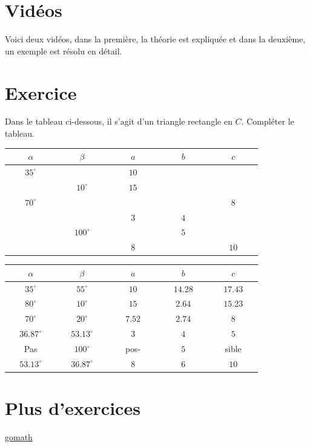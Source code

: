 \documentclass[a4paper,11pt]{article}
\begin{document}
\section{Vidéos}
Voici deux vidéos, dans la première, la théorie est expliquée et dans la deuxième, un exemple est résolu en détail.\\
 


\section{Exercice}
Dans le tableau ci-dessous, il s'agit d'un triangle rectangle en $C$. Compléter le tableau.
\begin{center}
\begin{tabular}{ | c | c | c | c | c | }
  \hline
 $\phantom{texte}\alpha\phantom{texte}$ & $\phantom{texte}\beta\phantom{texte}$ \phantom{texte}& $\phantom{texte}a\phantom{texte}$ & $\phantom{texte}b\phantom{texte}$ & $\phantom{texte}c\phantom{texte}$   \\
   \hline
 $35^{\circ}$ &  & $10$ &  &    \\
   \hline
  & $10^{\circ}$ & $15$ &  &    \\
   \hline
$70^{\circ}$  &  &  &  &  $8$  \\
   \hline
  &  & $3$ & $4$  &    \\
   \hline
  & $100^{\circ}$ &  & $5$ &    \\
   \hline
  &  & $8$ &  &  $10$  \\
   \hline
\end{tabular}
\end{center}

\begin{solution}
\begin{center}
\begin{tabular}{ | c | c | c | c | c | }
  \hline
 $\phantom{texte}\alpha\phantom{texte}$ & $\phantom{texte}\beta\phantom{texte}$ \phantom{texte}& $\phantom{texte}a\phantom{texte}$ & $\phantom{texte}b\phantom{texte}$ & $\phantom{texte}c\phantom{texte}$   \\
   \hline
 $35^{\circ}$ & $55^{\circ}$ & $10$ & $14.28$ & $17.43$   \\
   \hline
 $80^{\circ}$ & $10^{\circ}$ & $15$ & $2.64$ & $15.23$   \\
   \hline
$70^{\circ}$  & $20^{\circ}$ & $7.52$ & $2.74$ &  $8$  \\
   \hline
$36.87^{\circ}$  & $53.13^{\circ}$ & $3$ & $4$  & $5$   \\
   \hline
 Pas & $100^{\circ}$ & pos- & $5$ &  sible  \\
   \hline
 $53.13^{\circ}$ & $36.87^{\circ}$ & $8$ & $6$ &  $10$  \\
   \hline
\end{tabular}
\end{center}
\end{solution}

\section{Plus d'exercices}
\href{https://www.gomaths.ch/print_trigo.php?find=3&nb_calcul=10}{gomath}
\end{document}
